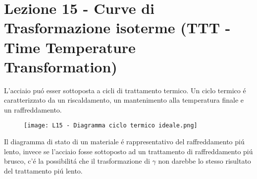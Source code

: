 \documentclass{article}
\begin{document}
{    \section{Lezione 15 - Curve di Trasformazione isoterme (TTT - Time Temperature Transformation)}
        L'acciaio pu\'o esser sottoposta a cicli di trattamento termico. Un ciclo termico \'e caratterizzato da un riscaldamento, un mantenimento alla temperatura finale e un raffreddamento.\\
        \begin{figure}[h!]
            \centering
            \texttt{[image: L15 - Diagramma ciclo termico ideale.png]}
        \end{figure}
        \newpage
        Il diagramma di stato di un materiale \'e rappresentativo del raffreddamento pi\'u lento, invece se l'acciaio fosse sottoposto ad un trattamento di raffreddamento pi\'u brusco, c'\'e la possibilit\'a che il trasformazione di $\gamma$ non darebbe lo stesso risultato del trattamento pi\'u lento.\\
}
\end{document}
